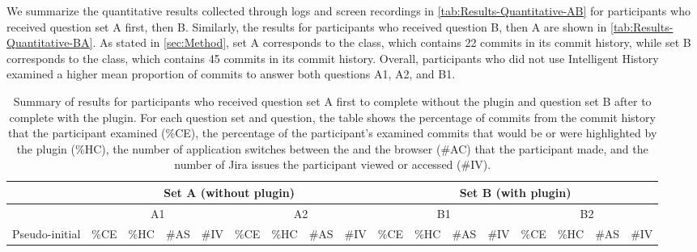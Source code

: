 We summarize the quantitative results collected through logs and screen recordings in \autoref{tab:Results-Quantitative-AB} for participants who received question set A first, then B.
Similarly, the results for participants who received question B, then A are shown in \autoref{tab:Results-Quantitative-BA}.
As stated in \autoref{sec:Method}, set A corresponds to the  class, which contains 22 commits in its commit history, 
while set B corresponds to the  class, which contains 45 commits in its commit history.
Overall, participants who did not use Intelligent History examined a higher mean proportion of commits to answer both questions A1, A2, and B1.

\begin{landscape}
  \begin{table}
    \footnotesize
    \caption{
      Summary of results for participants who received question set A first to complete without the plugin and question set B after to complete with the plugin.
      For each question set and question, the table shows the percentage of commits from the commit history that the participant examined (\%CE), 
      the percentage of the participant's examined commits that would be or were highlighted by the plugin (\%HC),
      the number of application switches between the  and the browser (\#AC) that the participant made,
      and the number of Jira issues the participant viewed or accessed (\#IV).
    }
    \centering
    \begin{tabular}{@{}ccccccccccccccccc@{}}
      \toprule
      \multicolumn{1}{l}{}                & \multicolumn{8}{c}{Set A (without plugin)}                                                                                                                            & \multicolumn{8}{c}{Set B (with plugin)}                                                                                                                                                                 \\ \midrule
      \multicolumn{1}{c|}{}               & \multicolumn{4}{c|}{A1}                                  & \multicolumn{4}{c|}{A2}                                                                                    & \multicolumn{4}{c|}{B1}                                                                     & \multicolumn{4}{c}{B2}                                                                                    \\ \midrule
      \multicolumn{1}{c|}{Pseudo-initial} & \%CE      & \%HC      & \#AS & \multicolumn{1}{l|}{\#IV} & \multicolumn{1}{l}{\%CE} & \multicolumn{1}{l}{\%HC} & \multicolumn{1}{l}{\#AS} & \multicolumn{1}{l|}{\#IV} & \%CE      & \multicolumn{1}{l}{\%HC} & \multicolumn{1}{l}{\#AS} & \multicolumn{1}{l|}{\#IV} & \multicolumn{1}{l}{\%CE} & \multicolumn{1}{l}{\%HC} & \multicolumn{1}{l}{\#AS} & \multicolumn{1}{l}{\#IV} \\ \midrule

\end{tabular}
\end{table}
\end{landscape}
